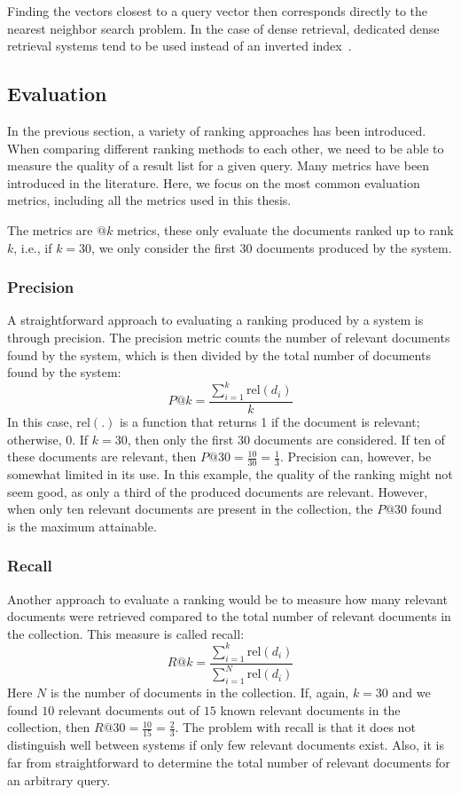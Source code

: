 Finding the vectors closest to a query vector then corresponds directly to the nearest neighbor search problem. In the case of dense retrieval, dedicated dense retrieval systems tend to be used instead of an inverted index~\citep{faiss}. 

\subsection{Evaluation}
\label{sec:evaluation}
In the previous section, a variety of ranking approaches has been introduced. When comparing different ranking methods to each other, we need to be able to measure the quality of a result list for a given query. Many metrics have been introduced in the literature. Here, we focus on the most common evaluation metrics, including all the metrics used in this thesis. 

The metrics are $@k$ metrics, these only evaluate the documents ranked up to rank $k$, i.e., if $k=30$, we only consider the first $30$ documents produced by the system.

\subsubsection{Precision}
A straightforward approach to evaluating a ranking produced by a system is through precision. The precision metric counts the number of relevant documents found by the system, which is then divided by the total number of documents found by the system:
\begin{equation}
	\textit{P}@k = \frac{\sum_{i=1}^k\text{rel}\left(d_i\right)}{k}
\end{equation}
In this case, $\text{rel}(.)$ is a function that returns 1 if the document is relevant; otherwise, 0.
If $k=30$, then only the first $30$ documents are considered. If ten of these documents are relevant, then $P@30 = \frac{10}{30} = \frac{1}{3}$. Precision can, however, be somewhat limited in its use. In this example, the quality of the ranking might not seem good, as only a third of the produced documents are relevant. However, when only ten relevant documents are present in the collection, the $P@30$ found is the maximum attainable.  

\subsubsection{Recall}
Another approach to evaluate a ranking would be to measure how many relevant documents were retrieved compared to the total number of relevant documents in the collection. This measure is called recall: 
\begin{equation}
	\textit{R}@k = \frac{\sum_{i=1}^k\text{rel}\left(d_i\right)}{\sum_{i=1}^N\text{rel}\left(d_i\right)}
\end{equation}
Here $N$ is the number of documents in the collection. If, again, $k=30$ and we found $10$ relevant documents out of $15$ known relevant documents in the collection, then $R@30 = \frac{10}{15} = \frac{2}{3}$. The problem with recall is that it does not distinguish well between systems if only few relevant documents exist. Also, it is far from straightforward to determine the total number of relevant documents for an arbitrary query.

